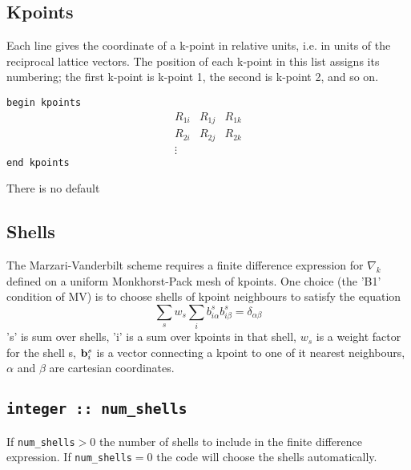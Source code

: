 %

\subsection[Kpoints]{Kpoints}
Each line gives the coordinate of a k-point
in relative units, i.e. in units of the reciprocal lattice
vectors.
The position  of each k-point in this
list assigns its numbering; the first k-point is k-point 1, the second
is k-point 2, and so on.


\noindent \verb#begin kpoints# \\
$$
\begin{array}{ccc}
 R_{1i} & R_{1j} & R_{1k} \\
 R_{2i} & R_{2j} & R_{2k} \\
\vdots
\end{array}
$$
\verb#end kpoints#


There is no default

\subsection{Shells}

The Marzari-Vanderbilt scheme requires a finite difference expression for $\nabla_k$
defined on a uniform Monkhorst-Pack mesh of kpoints. One choice (the 'B1' condition of MV)
is to choose shells of kpoint neighbours to satisfy the equation
\begin{equation}\nonumber
\sum_s w_s \sum_i b_{i\alpha}^s b_{i\beta}^s = \delta_{\alpha\beta}
\end{equation}
's' is sum over shells, 'i' is a sum over kpoints in that shell, $w_s$ is a weight factor for the shell s, ${\bf b}_{i}^s$
is a vector connecting a kpoint to one of it nearest neighbours, $\alpha$ and $\beta$ are cartesian coordinates.

\subsection[num\_shells]{\tt integer :: num\_shells}

If \verb#num_shells#$>0$ the number of shells to include in the finite difference expression.
If \verb#num_shells#$=0$ the code will choose the shells automatically. 

